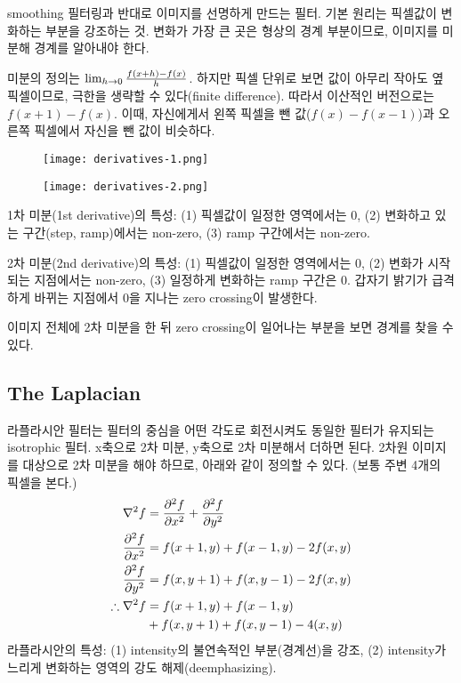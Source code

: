 smoothing 필터링과 반대로 이미지를 선명하게 만드는 필터. 기본 원리는 픽셀값이 변화하는 부분을 강조하는 것. 변화가 가장 큰 곳은 형상의 경계 부분이므로, 이미지를 미분해 경계를 알아내야 한다.

미분의 정의는 $\lim_{h \rightarrow 0} {f(x + h) - f(x) \over h}$. 하지만 픽셀 단위로 보면 값이 아무리 작아도 옆 픽셀이므로, 극한을 생략할 수 있다(finite difference). 따라서 이산적인 버전으로는 $f(x + 1) - f(x)$. 이때, 자신에게서 왼쪽 픽셀을 뺀 값($f(x) - f(x - 1)$)과 오른쪽 픽셀에서 자신을 뺀 값이 비슷하다.

\begin{figure}[h]
  \centering
  \texttt{[image: derivatives-1.png]}
\end{figure}

\begin{figure}[h]
  \centering
  \texttt{[image: derivatives-2.png]}
\end{figure}

1차 미분(1st derivative)의 특성: (1) 픽셀값이 일정한 영역에서는 0, (2) 변화하고 있는 구간(step, ramp)에서는 non-zero, (3) ramp 구간에서는 non-zero.

2차 미분(2nd derivative)의 특성: (1) 픽셀값이 일정한 영역에서는 0, (2) 변화가 시작되는 지점에서는 non-zero, (3) 일정하게 변화하는 ramp 구간은 0. 갑자기 밝기가 급격하게 바뀌는 지점에서 0을 지나는 zero crossing이 발생한다.

이미지 전체에 2차 미분을 한 뒤 zero crossing이 일어나는 부분을 보면 경계를 찾을 수 있다.

\subsection{The Laplacian}

라플라시안 필터는 필터의 중심을 어떤 각도로 회전시켜도 동일한 필터가 유지되는 isotrophic 필터. x축으로 2차 미분, y축으로 2차 미분해서 더하면 된다. 2차원 이미지를 대상으로 2차 미분을 해야 하므로, 아래와 같이 정의할 수 있다. (보통 주변 4개의 픽셀을 본다.)
$$
\begin{aligned}
  \nabla^2 f &= {\partial^2 f \over \partial x^2} + {\partial^2 f \over \partial y^2} \\
  {\partial^2 f \over \partial x^2} &= f(x + 1, y) + f(x - 1, y) - 2f(x, y) \\
  {\partial^2 f \over \partial y^2} &= f(x, y + 1) + f(x, y - 1) - 2f(x, y) \\
  \therefore \nabla^2 f &= f(x + 1, y) + f(x - 1, y) \\
                        &+ f(x, y + 1) + f(x, y - 1) - 4(x, y)
\end{aligned}
$$
라플라시안의 특성: (1) intensity의 불연속적인 부분(경계선)을 강조, (2) intensity가 느리게 변화하는 영역의 강도 해제(deemphasizing).

